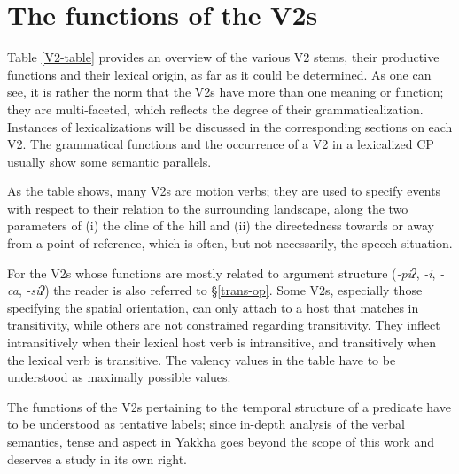 \section{The functions of the V2s}\label{verb-verb-functional}

Table \ref{V2-table} provides an overview of the various V2 stems, their productive functions and their lexical origin, as far as it could be determined. As one can see, it is rather the norm that the V2s have more than one meaning or function; they are multi-faceted, which reflects the degree of their grammaticalization. Instances of lexicalizations will be discussed in the corresponding sections on each V2. The grammatical functions and the occurrence of a V2 in a lexicalized CP usually show some semantic parallels. 

As the table shows, many V2s are motion verbs; they are used to specify events with respect to their  relation to the surrounding landscape, along the two para\-meters of (i) the cline of the hill and (ii) the directedness towards or away from a point of reference, which is often, but not necessarily, the speech situation. 

For the V2s whose functions are mostly related to argument structure (\emph{-piʔ}, \emph{-i}, \emph{-ca}, \emph{-siʔ}) the reader is also referred to §\ref{trans-op}. Some V2s, especially those specifying the spatial  orientation,  can  only attach to a host that matches in transitivity, while others are not constrained regarding transitivity. They inflect intransitively when their lexical host  verb is intransitive, and transitively when the lexical verb is transitive. The valency values in the table have to be understood as maximally possible values.

The functions of the V2s pertaining to the temporal structure of a predicate have to be understood as tentative labels; since in-depth analysis of the verbal semantics, tense and aspect in Yakkha goes beyond the scope of this work and deserves a study in its own right.





